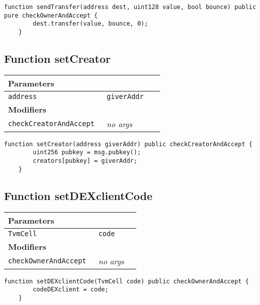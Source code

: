 \vspace{2cm}

\begin{lstlisting}[firstnumber=71]
	function sendTransfer(address dest, uint128 value, bool bounce) public pure checkOwnerAndAccept {
		dest.transfer(value, bounce, 0);
	}
\end{lstlisting}

\subsection{Function setCreator}


\ifsoltables
\noindent\begin{tabular}{|l|l|p{5cm}|}\hline
\multicolumn{3}{|l|}{\bf Parameters}\\\hline
\tt address & \tt giverAddr &\\\hline
\multicolumn{3}{|l|}{\bf Modifiers}\\\hline
\tt checkCreatorAndAccept & {\em no args} &\\\hline
\end{tabular}
\fi

\vspace{2cm}

\begin{lstlisting}[firstnumber=100]
	function setCreator(address giverAddr) public checkCreatorAndAccept {
		uint256 pubkey = msg.pubkey();
		creators[pubkey] = giverAddr;
	}
\end{lstlisting}

\subsection{Function setDEXclientCode}


\ifsoltables
\noindent\begin{tabular}{|l|l|p{5cm}|}\hline
\multicolumn{3}{|l|}{\bf Parameters}\\\hline
\tt TvmCell & \tt code &\\\hline
\multicolumn{3}{|l|}{\bf Modifiers}\\\hline
\tt checkOwnerAndAccept & {\em no args} &\\\hline
\end{tabular}
\fi

\vspace{2cm}

\begin{lstlisting}[firstnumber=80]
	function setDEXclientCode(TvmCell code) public checkOwnerAndAccept {
		codeDEXclient = code;
	}
\end{lstlisting}

